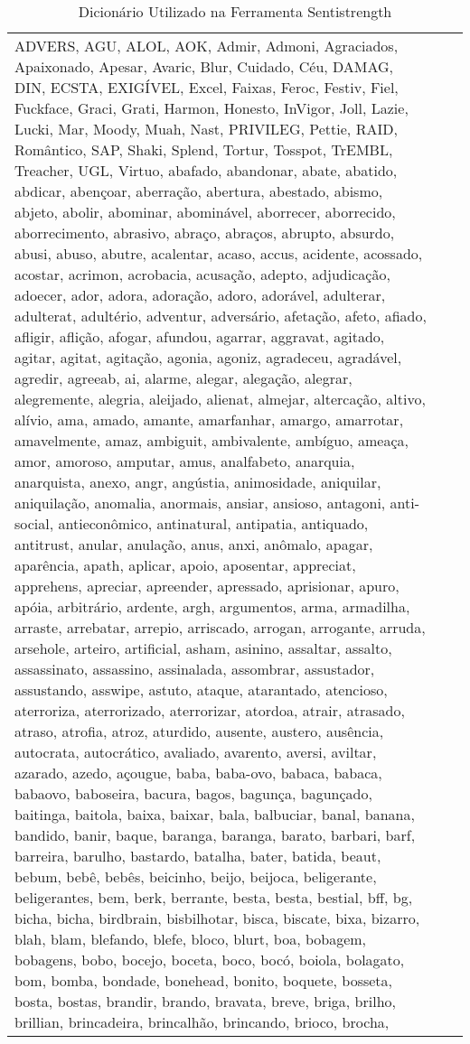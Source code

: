 \newpage
{}



\begin{longtable}{|*3{p{15cm}|}}
\caption{Dicionário Utilizado na Ferramenta Sentistrength} \label{appendix:dicionario-sentistrength}
    \hline
ADVERS, AGU, ALOL, AOK, Admir, Admoni, Agraciados, Apaixonado, Apesar, Avaric, Blur, Cuidado, Céu, DAMAG, DIN, ECSTA, EXIGÍVEL, Excel, Faixas, Feroc, Festiv, Fiel, Fuckface, Graci, Grati, Harmon, Honesto, InVigor, Joll, Lazie, Lucki, Mar, Moody, Muah, Nast, PRIVILEG, Pettie, RAID, Romântico, SAP, Shaki, Splend, Tortur, Tosspot, TrEMBL, Treacher, UGL, Virtuo, abafado, abandonar, abate, abatido, abdicar, abençoar, aberração, abertura, abestado, abismo, abjeto, abolir, abominar, abominável, aborrecer, aborrecido, aborrecimento, abrasivo, abraço, abraços, abrupto, absurdo, abusi, abuso, abutre, acalentar, acaso, accus, acidente, acossado, acostar, acrimon, acrobacia, acusação, adepto, adjudicação, adoecer, ador, adora, adoração, adoro, adorável, adulterar, adulterat, adultério, adventur, adversário, afetação, afeto, afiado, afligir, aflição, afogar, afundou, agarrar, aggravat, agitado, agitar, agitat, agitação, agonia, agoniz, agradeceu, agradável, agredir, agreeab, ai, alarme, alegar, alegação, alegrar, alegremente, alegria, aleijado, alienat, almejar, altercação, altivo, alívio, ama, amado, amante, amarfanhar, amargo, amarrotar, amavelmente, amaz, ambiguit, ambivalente, ambíguo, ameaça, amor, amoroso, amputar, amus, analfabeto, anarquia, anarquista, anexo, angr, angústia, animosidade, aniquilar, aniquilação, anomalia, anormais, ansiar, ansioso, antagoni, anti-social, antieconômico, antinatural, antipatia, antiquado, antitrust, anular, anulação, anus, anxi, anômalo, apagar, aparência, apath, aplicar, apoio, aposentar, appreciat, apprehens, apreciar, apreender, apressado, aprisionar, apuro, apóia, arbitrário, ardente, argh, argumentos, arma, armadilha, arraste, arrebatar, arrepio, arriscado, arrogan, arrogante, arruda, arsehole, arteiro, artificial, asham, asinino, assaltar, assalto, assassinato, assassino, assinalada, assombrar, assustador, assustando, asswipe, astuto, ataque, atarantado, atencioso, aterroriza, aterrorizado, aterrorizar, atordoa, atrair, atrasado, atraso, atrofia, atroz, aturdido, ausente, austero, ausência, autocrata, autocrático, avaliado, avarento, aversi, aviltar, azarado, azedo, açougue, baba, baba-ovo, babaca, babaca, babaovo, baboseira, bacura, bagos, bagunça, bagunçado, baitinga, baitola, baixa, baixar, bala, balbuciar, banal, banana, bandido, banir, baque, baranga, baranga, barato, barbari, barf, barreira, barulho, bastardo, batalha, bater, batida, beaut, bebum, bebê, bebês, beicinho, beijo, beijoca, beligerante, beligerantes, bem, berk, berrante, besta, besta, bestial, bff, bg, bicha, bicha, birdbrain, bisbilhotar, bisca, biscate, bixa, bizarro, blah, blam, blefando, blefe, bloco, blurt, boa, bobagem, bobagens, bobo, bocejo, boceta, boco, bocó, boiola, bolagato, bom, bomba, bondade, bonehead, bonito, boquete, bosseta, bosta, bostas, brandir, brando, bravata, breve, briga, brilho, brillian, brincadeira, brincalhão, brincando, brioco, brocha, 
\end{longtable}
